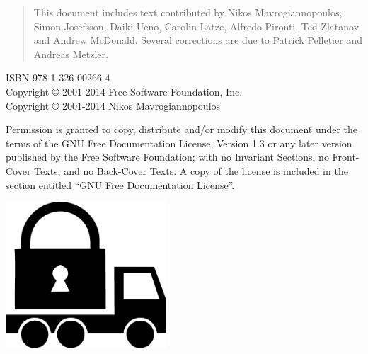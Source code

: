 \thispagestyle{empty}

\begin{quotation}
This document includes text contributed by
Nikos Mavrogiannopoulos, Simon Josefsson, Daiki Ueno, 
Carolin Latze, Alfredo Pironti, Ted Zlatanov and Andrew McDonald. Several corrections are due
to Patrick Pelletier and Andreas Metzler.
\end{quotation}



\begin{flushleft}
ISBN 978-1-326-00266-4\\
Copyright \copyright{} 2001-2014 Free Software Foundation, Inc.\\
Copyright \copyright{} 2001-2014 Nikos Mavrogiannopoulos
\end{flushleft}

\begin{flushleft}
Permission is granted to copy, distribute and/or modify this document
under the terms of the GNU Free Documentation License, Version 1.3 or
any later version published by the Free Software Foundation; with no
Invariant Sections, no Front-Cover Texts, and no Back-Cover Texts.  A
copy of the license is included in the section entitled ``GNU Free
Documentation License''.
\end{flushleft}

\newpage
\thispagestyle{empty}

\begin{center}
\includegraphics[width=6cm]{../gnutls-logo.pdf}
\end{center}

